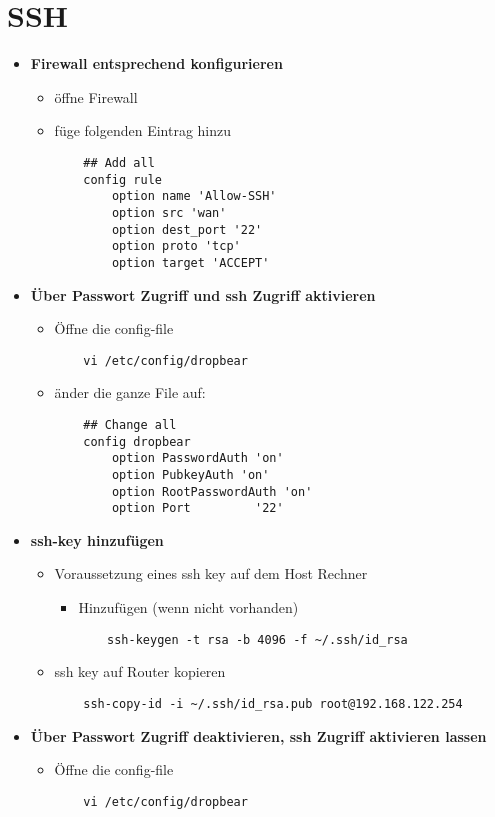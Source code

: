 \section{SSH}
\begin{itemize}
	\item \textbf{Firewall entsprechend konfigurieren}
	\begin{itemize}
	\item öffne Firewall
	\item füge folgenden Eintrag hinzu
	\begin{verbatim}
	## Add all
	config rule                                            
        option name 'Allow-SSH'                        
        option src 'wan'                           
        option dest_port '22'                      
        option proto 'tcp'                             
        option target 'ACCEPT'
	\end{verbatim}	
	\end{itemize}		
	
	\item \textbf{Über Passwort Zugriff und ssh Zugriff aktivieren}
	\begin{itemize}
	\item Öffne die config-file
	\begin{verbatim}
	vi /etc/config/dropbear
	\end{verbatim}
	
	\item änder die ganze File auf: 
	\begin{verbatim}
	## Change all
	config dropbear
        option PasswordAuth 'on'
        option PubkeyAuth 'on'
        option RootPasswordAuth 'on'
        option Port         '22'
	\end{verbatim}
	\end{itemize}
	
	\item \textbf{ssh-key hinzufügen}
	\begin{itemize}
	\item Voraussetzung eines ssh key auf dem Host Rechner
	\begin{itemize}
	\item Hinzufügen (wenn nicht vorhanden)
	\begin{verbatim}
	ssh-keygen -t rsa -b 4096 -f ~/.ssh/id_rsa
	\end{verbatim}
	\end{itemize}	 
	\item ssh key auf Router kopieren
	\begin{verbatim}
	ssh-copy-id -i ~/.ssh/id_rsa.pub root@192.168.122.254
	\end{verbatim}
	\end{itemize}
		\newpage 
	\item \textbf{Über Passwort Zugriff deaktivieren, ssh Zugriff aktivieren lassen}
	\begin{itemize}
	\item Öffne die config-file
	\begin{verbatim}
	vi /etc/config/dropbear
	\end{verbatim}
	

\end{itemize}
\end{itemize}
